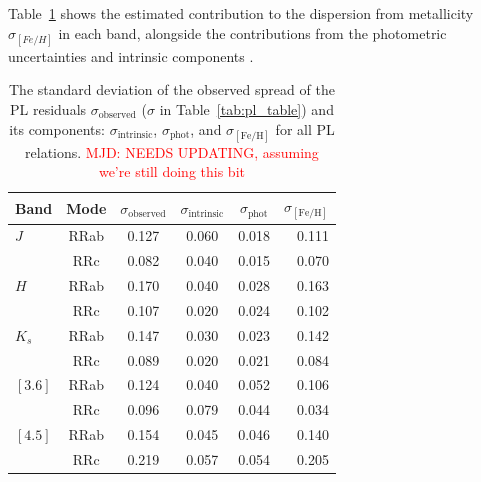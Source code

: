 \documentclass[a4paper,fleqn,usenatbib]{mnras}
\newcommand{\ocen}{$\omega$~Cen\xspace}
\providecommand{\mjdcomment}[1]{{\textcolor{red}{{MJD: #1}}}\xspace}
\begin{document}
Table~\ref{tab:metallicity_sigma} shows the estimated contribution to the dispersion from metallicity $\sigma_{[Fe/H]}$ in each band, alongside the contributions from the photometric uncertainties and intrinsic components \citep[from][for the near-- and mid--IR, respectively]{2015ApJ...808...50M, 2015ApJ...808...11N}. %


\begin{table}
\centering
\caption{The standard deviation of the observed spread of the PL residuals $\sigma_{\text{observed}}$ ($\sigma$ in Table~\ref{tab:pl_table}) and its components: $\sigma_{\text{intrinsic}}$, $\sigma_{\text{phot}}$, and $\sigma_{[\text{Fe/H}]}$ for all PL relations. \mjdcomment{NEEDS UPDATING, assuming we're still doing this bit}}
\label{tab:metallicity_sigma}
\begin{tabular}{lccccr} 
\hline \hline
Band & Mode & $\sigma_{\text{observed}}$ & $\sigma_{\text{intrinsic}}$ & $\sigma_{\text{phot}}$ & $\sigma_{[\text{Fe/H}]}$ \\
\hline
$J$ & RRab & 0.127 & 0.060 & 0.018 & 0.111 \\
  & RRc & 0.082 & 0.040 & 0.015 & 0.070 \\
$H$ & RRab & 0.170 & 0.040 & 0.028 & 0.163 \\
  & RRc & 0.107 & 0.020 & 0.024 & 0.102 \\
$K_s$ & RRab & 0.147 & 0.030 & 0.023 & 0.142 \\
  & RRc & 0.089 & 0.020 & 0.021 & 0.084 \\
$[3.6]$  & RRab & 0.124 & 0.040 & 0.052 & 0.106 \\
  & RRc & 0.096 & 0.079 & 0.044 & 0.034 \\
$[4.5]$& RRab & 0.154 & 0.045 & 0.046 & 0.140 \\
  & RRc & 0.219 & 0.057 & 0.054 & 0.205 \\
\hline
\end{tabular}
\end{table}
\end{document}
